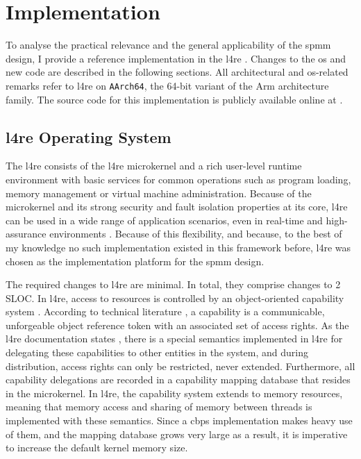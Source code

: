 \chapter{Implementation}
\label{chap:implementation}

To analyse the practical relevance and the general applicability of the \ac{spmm} design, I provide a reference implementation in the \acl{l4re} \cite{l4re}.
Changes to the \ac{os} and new code are described in the following sections.
All architectural and \ac{os}-related remarks refer to \ac{l4re} on \texttt{AArch64}, the 64-bit variant of the Arm architecture family.
The source code for this implementation is publicly available online at \cite{l4re-spm}.

\section{\acs{l4re} Operating System}
\label{sec:l4re-os}

The \acl{l4re} consists of the \acs{l4re} microkernel and a rich user-level runtime environment with basic services for common operations such as program loading, memory management or virtual machine administration.
Because of the microkernel and its strong security and fault isolation properties at its core, \ac{l4re} can be used in a wide range of application scenarios, even in real-time and high-assurance environments \cite{l4re-industries}.
Because of this flexibility, and because, to the best of my knowledge no such implementation existed in this framework before, \ac{l4re} was chosen as the implementation platform for the \ac{spmm} design.

The required changes to \ac{l4re} are minimal.
In total, they comprise changes to 2 SLOC.
In \ac{l4re}, access to resources is controlled by an object-oriented capability system \cite{l4re-capabilities}.
According to technical literature \cite{capability1999}, a capability is a communicable, unforgeable object reference token with an associated set of access rights.
As the \ac{l4re} documentation states \cite{l4re-capabilities}, there is a special semantics implemented in \ac{l4re} for delegating these capabilities to other entities in the system, and during distribution, access rights can only be restricted, never extended.
Furthermore, all capability delegations are recorded in a capability mapping database that resides in the microkernel.
In \ac{l4re}, the capability system extends to memory resources, meaning that memory access and sharing of memory between threads is implemented with these semantics.
Since a \ac{cbps} implementation makes heavy use of them, and the mapping database grows very large as a result, it is imperative to increase the default kernel memory size.

